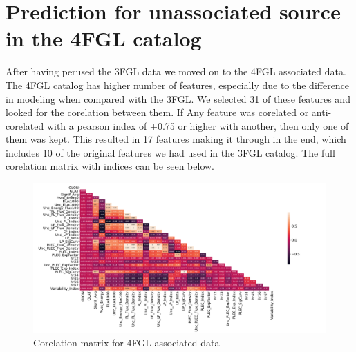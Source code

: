 \section{Prediction for unassociated source in the 4FGL catalog}

After having perused the 3FGL data we moved on to the 4FGL associated data. The 4FGL catalog has higher number of features, especially due to the difference in modeling when compared with the 3FGL. We selected 31 of these features and looked for the corelation between them. If Any feature was corelated or anti-corelated with a pearson index of $\pm$0.75 or higher with another, then only one of them was kept. This resulted in 17 features making it through in the end, which includes 10 of the original features we had used in the 3FGL catalog. The full corelation matrix with indices can be seen below.\\

\begin{figure}[h]
\centering
\includegraphics[width=\textwidth]{plots/correlation_4fgl_assoc.pdf}
\caption{Corelation matrix for 4FGL associated data }
\label{fig:Maps_data}
\end{figure}


